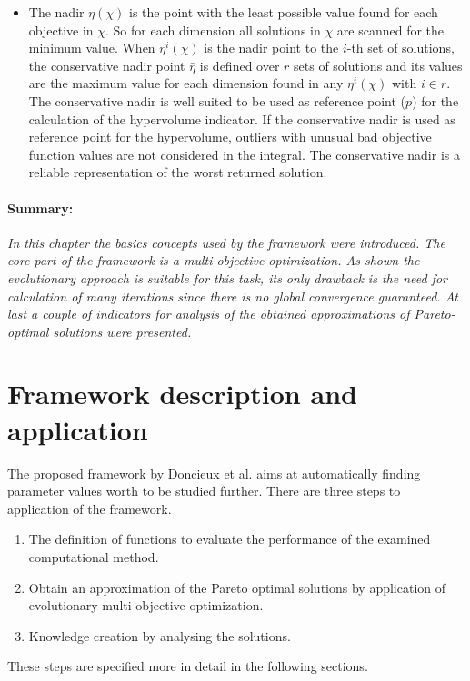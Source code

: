 \documentclass[12pt,twoside]{article}
\theoremstyle{plain}
\theoremstyle{definition}
\theoremstyle{remark}
\begin{document}
\begin{itemize}
	\item The nadir $\eta(\chi)$ is the point with the least possible value found for each objective in $\chi$. So for each dimension all solutions in $\chi$ are scanned for the minimum value.
	When $\eta^i(\chi)$ is the nadir point to the $i$-th set of solutions, the conservative nadir point $\bar{\eta}$ is defined over $r$ sets of solutions and its values are the maximum value for each dimension found in any $\eta^i(\chi)$ with $i\in r$. The conservative nadir is well suited to be used as reference point ($p$) for the calculation of the hypervolume indicator. If the conservative nadir is used as reference point for the hypervolume, outliers with unusual bad objective function values are not considered in the integral. The conservative nadir is a reliable representation of the \glqq worst\grqq{} returned solution.
\end{itemize}
\paragraph{Summary:}
\textit{
	In this chapter the basics concepts used by the framework were introduced.
	The core part of the framework is a multi-objective optimization. 
	As shown the evolutionary approach is suitable for this task, its only drawback is the need for calculation of many iterations since there is no global convergence guaranteed.
	At last a couple of indicators for analysis of the obtained approximations of Pareto-optimal solutions were presented.
}

\section{Framework description and application}
\label{sec:model}
The proposed framework by Doncieux et al. \cite{doncieux2015multi} aims at automatically finding parameter values worth to be studied further.
There are three steps to application of the framework.
\begin{enumerate}
	\item The definition of functions to evaluate the performance of the examined computational method.
	\item Obtain an approximation of the Pareto optimal solutions by application of evolutionary multi-objective optimization.
	\item Knowledge creation by analysing the solutions.
\end{enumerate}
These steps are specified more in detail in the following sections.
\end{document}
